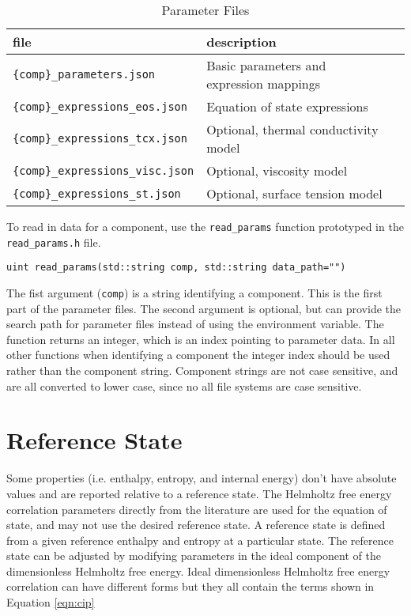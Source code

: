 \documentclass[oneside]{book}
\begin{document}
\begin{table}[h!]
\centering
\caption{Parameter Files}
\begin{tabular}{ l l l }
\hline
file & description  \\
\hline
\hline
\texttt{\{comp\}\_parameters.json} &  Basic parameters and expression mappings\\ [1ex]
\texttt{\{comp\}\_expressions\_eos.json} &  Equation of state expressions \\ [1ex]
\texttt{\{comp\}\_expressions\_tcx.json} &  Optional, thermal conductivity model \\ [1ex]
\texttt{\{comp\}\_expressions\_visc.json} &  Optional, viscosity model \\ [1ex]
\texttt{\{comp\}\_expressions\_st.json} &  Optional, surface tension model \\ [1ex]
 \hline    
\end{tabular}
\label{table:parameter_files}
\end{table}

To read in data for a component, use the \texttt{read\_params} function prototyped in the \texttt{read\_params.h} file.

\begin{verbatim}
uint read_params(std::string comp, std::string data_path="")
\end{verbatim}

The fist argument (\texttt{comp}) is a string identifying a component.  This is the first part of the parameter files.  The second argument is optional, but can provide the search path for parameter files instead of using the environment variable.  The function returns an integer, which is an index pointing to parameter data.  In all other functions when identifying a component the integer index should be used rather than the component string.  Component strings are not case sensitive, and are all converted to lower case, since no all file systems are case sensitive. 

\section{Reference State}

Some properties (i.e. enthalpy, entropy, and internal energy) don't have absolute values and are reported relative to a reference state. The Helmholtz free energy correlation parameters directly from the literature are used for the equation of state, and may not use the desired reference state.  A reference state is defined from a given reference enthalpy and entropy at a particular state. The reference state can be adjusted by modifying parameters in the ideal component of the dimensionless Helmholtz free energy.  Ideal dimensionless Helmholtz free energy correlation can have different forms but they all contain the terms shown in Equation \ref{eqn:cip}
\end{document}
